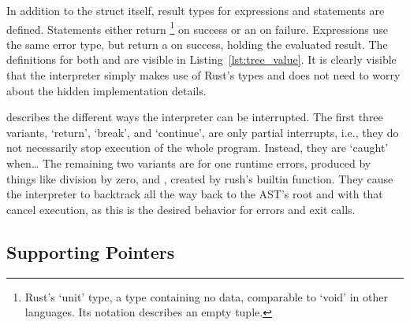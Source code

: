 
In addition to the struct itself, result types for expressions and statements are defined.
Statements either return \qVerb{()}\footnote{Rust's `unit' type, a type containing no data, comparable to `void' in other languages. Its notation describes an empty tuple.} on success or an  on failure.
Expressions use the same error type, but return a  on success, holding the evaluated result.
The definitions for both  and  are visible in Listing~\ref{lst:tree_value}.
It is clearly visible that the interpreter simply makes use of Rust's types and does not need to worry about the hidden implementation details.


 describes the different ways the interpreter can be interrupted.
The first three variants, `return', `break', and `continue', are only partial interrupts, i.e., they do not necessarily stop execution of the whole program.
Instead, they are `caught' when\ldots
The remaining two variants are for one runtime errors, produced by things like division by zero, and , created by rush's builtin  function.
They cause the interpreter to backtrack all the way back to the AST's root and with that cancel execution, as this is the desired behavior for errors and exit calls.

\subsection{Supporting Pointers}\label{sec:tree_pointers}

